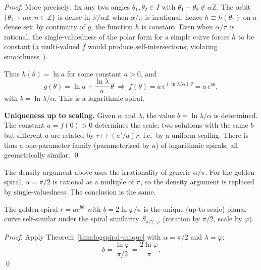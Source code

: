\begin{proof}
More precisely: fix any two angles \(\theta_1, \theta_2 \in I\)
with \(\theta_1 - \theta_2 \notin \alpha\mathbb{Z}\).  The
orbit \(\{\theta_1 + n\alpha : n \in \mathbb{Z}\}\) is dense in
\(\mathbb{R}/\alpha\mathbb{Z}\) when \(\alpha/\pi\) is
irrational, hence \(h \equiv h(\theta_1)\) on a dense set; by
continuity of \(g\), the function \(h\) is constant.  Even when
\(\alpha/\pi\) is rational, the single-valuedness of the polar
form for a simple curve forces \(h\) to be constant (a
multi-valued \(f\) would produce self-intersections, violating
smoothness~\cite{kappraff_connections}).

Thus \(h(\theta) = \ln a\) for some constant \(a > 0\), and
\[
  g(\theta) = \ln a + \frac{\ln\lambda}{\alpha}\,\theta
  \;\Longrightarrow\;
  f(\theta) = a\,e^{(\ln\lambda/\alpha)\,\theta} = a\,e^{b\theta},
\]
with \(b = \ln\lambda/\alpha\).  This is a logarithmic spiral.

\medskip
\noindent\textbf{Uniqueness up to scaling.}
Given \(\alpha\) and \(\lambda\), the value \(b = \ln\lambda/\alpha\)
is determined.  The constant \(a = f(0) > 0\) determines the
scale: two solutions with the same \(b\) but different \(a\)
are related by \(r \mapsto (a'/a) r\), i.e.\ by a uniform
scaling.  There is thus a one-parameter family (parameterised
by \(a\)) of logarithmic spirals, all geometrically similar.
\qed
\end{proof}

\begin{remark}
The density argument above uses the irrationality of generic
\(\alpha/\pi\).  For the golden spiral, \(\alpha = \pi/2\) is
rational as a multiple of \(\pi\), so the density argument is
replaced by single-valuedness.  The conclusion is the same.
\end{remark}

\begin{corollary}
\label{cor:golden-unique}
The golden spiral \(r = a e^{b\theta}\) with
\(b = 2\ln\varphi/\pi\) is the unique (up to scale) planar
curve self-similar under the spiral similarity
\(S_{\pi/2,\,\varphi}\) (rotation by \(\pi/2\), scale by
\(\varphi\)).
\end{corollary}

\begin{proof}
Apply Theorem~\ref{thm:logspiral-unique} with \(\alpha = \pi/2\)
and \(\lambda = \varphi\):
\[
  b = \frac{\ln\varphi}{\pi/2} = \frac{2\ln\varphi}{\pi}.
\]
\qed
\end{proof}

